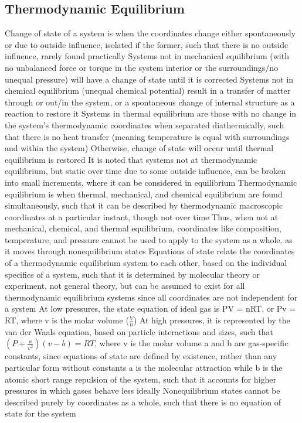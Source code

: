 \subsection{Thermodynamic Equilibrium}
\begin{outline*}
\1 Change of state of a system is when the coordinates change either spontaneously or due to outside influence, isolated if the former, such that there is no outside influence, rarely found practically
\2 Systems not in mechanical equilibrium (with no unbalanced force or torque in the system interior or the surroundings/no unequal pressure) will have a change of state until it is corrected
\2 Systems not in chemical equilibrium (unequal chemical potential) result in a transfer of matter through or out/in the system, or a spontaneous change of internal structure as a reaction to restore it
\2 Systems in thermal equilibrium are those with no change in the system's thermodynamic coordinates when separated diathermically, such that there is no heat transfer (meaning temperature is equal with surroundings and within the system)
\3 Otherwise, change of state will occur until thermal equilibrium is restored
\2 It is noted that systems not at thermodynamic equilibrium, but static over time due to some outside influence, can be broken into small increments, where it can be considered in equilibrium
\1 Thermodynamic equilibrium is when thermal, mechanical, and chemical equilibrium are found simultaneously, such that it can be described by thermodynamic macroscopic coordinates at a particular instant, though not over time
\2 Thus, when not at mechanical, chemical, and thermal equilibrium, coordinates like composition, temperature, and pressure cannot be used to apply to the system as a whole, as it moves through nonequilibrium states
\1 Equations of state relate the coordinates of a thermodynamic equilibrium system to each other, based on the individual specifics of a system, such that it is determined by molecular theory or experiment, not general theory, but can be assumed to exist for all thermodynamic equilibrium systems since all coordinates are not independent for a system
\2 At low pressures, the state equation of ideal gas is PV = nRT, or Pv = RT, where v is the molar volume ($\frac{V}{n}$)
\2 At high pressures, it is represented by the van der Waals equation, based on particle interactions and sizes, such that $(P + \frac{a}{v^2})(v - b) = RT$, where v is the molar volume
\3 a and b are gas-specific constants, since equations of state are defined by existence, rather than any particular form without constants
\3 a is the molecular attraction while b is the atomic short range repulsion of the system, such that it accounts for higher pressures in which gases behave less ideally 
\2 Nonequilibrium states cannot be described purely by coordinates as a whole, such that there is no equation of state for the system
\end{outline*}
